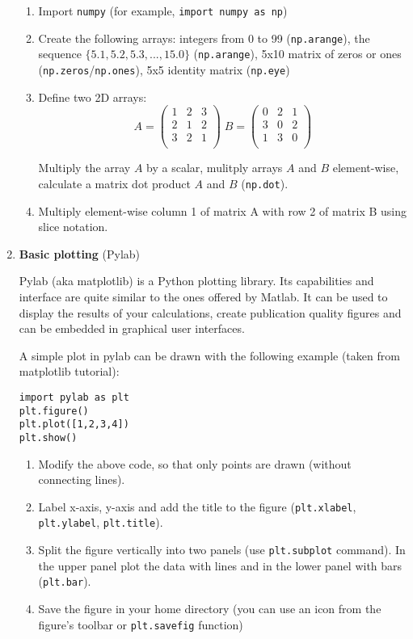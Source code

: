 \documentclass[12pt, a4]{article}
\begin{document}
\begin{enumerate}
\begin{enumerate}
 \item Import \texttt{numpy} (for example, \texttt{import numpy as
     np})
 \item Create the following arrays: integers from 0 to 99
     (\texttt{np.arange}), the sequence $\lbrace5.1, 5.2, 5.3, ...,
     15.0\rbrace$ (\texttt{np.arange}), 5x10 matrix of zeros or ones
     (\texttt{np.zeros}/\texttt{np.ones}), 5x5 identity matrix
     (\texttt{np.eye})
 \item Define two 2D arrays:
$$
A=\left(
\begin{array}{ccc}
1 & 2 & 3 \\
2 & 1 & 2 \\
3 & 2 & 1 \\
\end{array}
\right) \;
B=\left(
\begin{array}{ccc}
0 & 2 & 1 \\
3 & 0 & 2 \\
1 & 3 & 0 \\
\end{array}
\right)
$$

Multiply the array $A$ by a scalar, mulitply arrays $A$ and $B$
element-wise, calculate a matrix dot product $A$ and $B$ (\texttt{np.dot}).
\item Multiply element-wise column 1 of matrix A with row 2 of matrix
    B using slice notation.
\end{enumerate}

\item \textbf{Basic plotting} (Pylab)
    \label{eq:pylab}

    Pylab (aka matplotlib) is a Python plotting library. Its  capabilities and interface are quite similar to the ones offered by Matlab. It can be used  to display the results of your calculations, create publication quality figures and can be embedded in graphical user interfaces.

A simple plot in pylab can be drawn with the following example (taken from matplotlib tutorial):
\begin{verbatim}
import pylab as plt
plt.figure()
plt.plot([1,2,3,4])
plt.show()
\end{verbatim} 

\begin{enumerate}
 \item Modify the above code, so that only points are drawn (without connecting lines).
 \item Label x-axis, y-axis and add the title to the figure
     (\texttt{plt.xlabel}, \texttt{plt.ylabel}, \texttt{plt.title}).
 \item Split the figure vertically into two panels (use
     \texttt{plt.subplot} command). In the upper panel plot the data with
     lines and in the lower panel with bars (\texttt{plt.bar}).
 \item Save the figure in your home directory (you can use an icon
     from the figure's toolbar or \texttt{plt.savefig} function)
\end{enumerate}


\end{enumerate}
\end{document}
